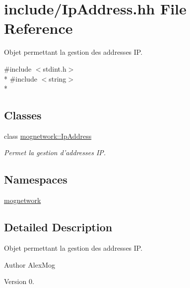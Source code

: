 \hypertarget{_ip_address_8hh}{\section{include/\-Ip\-Address.hh File Reference}
\label{_ip_address_8hh}
}


Objet permettant la gestion des addresses I\-P.  


{\ttfamily \#include $<$stdint.\-h$>$}\\*
{\ttfamily \#include $<$string$>$}\\*
\subsection*{Classes}
\begin{DoxyCompactItemize}
\item 
class \hyperlink{classmognetwork_1_1_ip_address}{mognetwork\-::\-Ip\-Address}
\begin{DoxyCompactList}\small\item\em Permet la gestion d'addresses I\-P. \end{DoxyCompactList}\end{DoxyCompactItemize}
\subsection*{Namespaces}
\begin{DoxyCompactItemize}
\item 
\hyperlink{namespacemognetwork}{mognetwork}
\end{DoxyCompactItemize}


\subsection{Detailed Description}
Objet permettant la gestion des addresses I\-P. \begin{DoxyAuthor}{Author}
Alex\-Mog 
\end{DoxyAuthor}
\begin{DoxyVersion}{Version}
0. 
\end{DoxyVersion}
